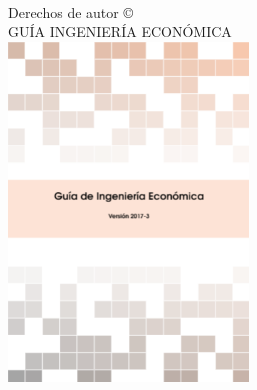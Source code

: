 \documentclass[11pt,fleqn]{book} %
\numberwithin{equation}{section} %
\numberwithin{figure}{section} %
\numberwithin{table}{section} %
\begin{document}










\newpage
~\vfill
\thispagestyle{empty}

\noindent Derechos de autor \copyright\\ %

\noindent \textsc{GUÍA INGENIERÍA ECONÓMICA}\\ %

\includegraphics[height=9cm]{img/chAnexos/gingeco.PNG}
\end{document}
